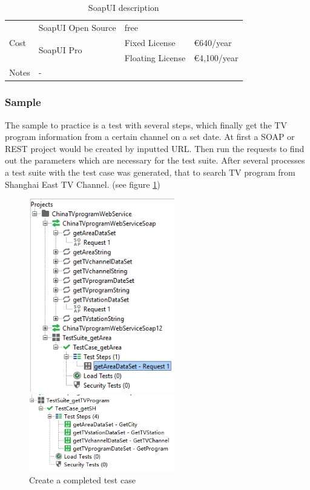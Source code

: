 \documentclass[12pt,a4paper,bibliography=totocnumbered,listof=totocnumbered]{article}
\begin{document}
\begin{table}[H]
\begin{tabular}{|l|l|l|l|}
	\multirow{3}{*}{Cost}                                              & SoapUI Open Source          & \multicolumn{2}{l|}{free} \\ \cline{2-4} 
																	   & \multirow{2}{*}{SoapUI Pro} & Fixed License       &	€640/year     \\ \cline{3-4} 
																	   &                             & Floating License    &	€4,100/year     \\ \hline
	Notes                                                              & \multicolumn{3}{l|}{-}                                   \\ \hline
	\end{tabular}
	\caption{SoapUI description}
	\label{tab:SoapUI}
\end{table} %

\subsubsection{Sample}
The sample to practice is a test with several steps, which finally get the TV program information from a certain channel on a set date.
At first a SOAP or REST project would be created by inputted URL. Then run the requests to find out the parameters which are necessary for the test suite.
After several processes a test suite with the test case was generated, that to search TV program from Shanghai East TV Channel. (see figure \ref{fig:soap01}) 
\begin{figure}[H] 
	\begin{minipage}[t]{0.5\linewidth} 
	\centering 
	\includegraphics[width=2.5in]{pics/soap01.png}
	\end{minipage}%
	\begin{minipage}[t]{0.5\linewidth} 
	\centering 
	\includegraphics[width=2.5in]{pics/soap02.png} 
	\end{minipage} %
	\caption{Create a completed test case}
	\label{fig:soap01}
\end{figure}
\end{document}
